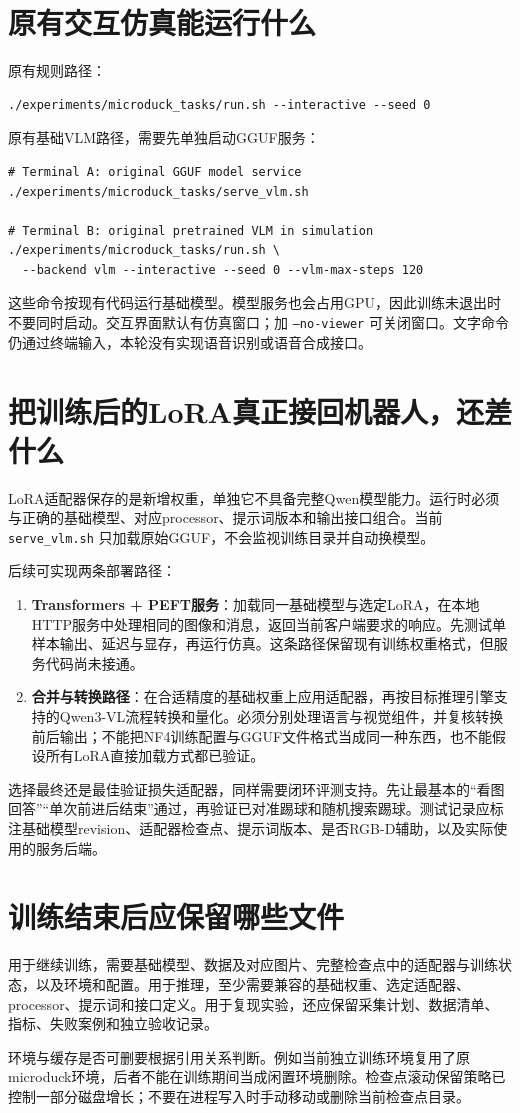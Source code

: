 \section{原有交互仿真能运行什么}
原有规则路径：
\begin{Verbatim}
./experiments/microduck_tasks/run.sh --interactive --seed 0
\end{Verbatim}

原有基础VLM路径，需要先单独启动GGUF服务：
\begin{Verbatim}
# Terminal A: original GGUF model service
./experiments/microduck_tasks/serve_vlm.sh

# Terminal B: original pretrained VLM in simulation
./experiments/microduck_tasks/run.sh \
  --backend vlm --interactive --seed 0 --vlm-max-steps 120
\end{Verbatim}
这些命令按现有代码运行基础模型。模型服务也会占用GPU，因此训练未退出时不要同时启动。交互界面默认有仿真窗口；加 \texttt{--no-viewer} 可关闭窗口。文字命令仍通过终端输入，本轮没有实现语音识别或语音合成接口。

\section{把训练后的LoRA真正接回机器人，还差什么}
LoRA适配器保存的是新增权重，单独它不具备完整Qwen模型能力。运行时必须与正确的基础模型、对应processor、提示词版本和输出接口组合。当前 \texttt{serve\_vlm.sh} 只加载原始GGUF，不会监视训练目录并自动换模型。

后续可实现两条部署路径：
\begin{enumerate}
\item \textbf{Transformers + PEFT服务}：加载同一基础模型与选定LoRA，在本地HTTP服务中处理相同的图像和消息，返回当前客户端要求的响应。先测试单样本输出、延迟与显存，再运行仿真。这条路径保留现有训练权重格式，但服务代码尚未接通。
\item \textbf{合并与转换路径}：在合适精度的基础权重上应用适配器，再按目标推理引擎支持的Qwen3-VL流程转换和量化。必须分别处理语言与视觉组件，并复核转换前后输出；不能把NF4训练配置与GGUF文件格式当成同一种东西，也不能假设所有LoRA直接加载方式都已验证。
\end{enumerate}

选择最终还是最佳验证损失适配器，同样需要闭环评测支持。先让最基本的“看图回答”“单次前进后结束”通过，再验证已对准踢球和随机搜索踢球。测试记录应标注基础模型revision、适配器检查点、提示词版本、是否RGB-D辅助，以及实际使用的服务后端。

\section{训练结束后应保留哪些文件}
用于继续训练，需要基础模型、数据及对应图片、完整检查点中的适配器与训练状态，以及环境和配置。用于推理，至少需要兼容的基础权重、选定适配器、processor、提示词和接口定义。用于复现实验，还应保留采集计划、数据清单、指标、失败案例和独立验收记录。

环境与缓存是否可删要根据引用关系判断。例如当前独立训练环境复用了原microduck环境，后者不能在训练期间当成闲置环境删除。检查点滚动保留策略已控制一部分磁盘增长；不要在进程写入时手动移动或删除当前检查点目录。
